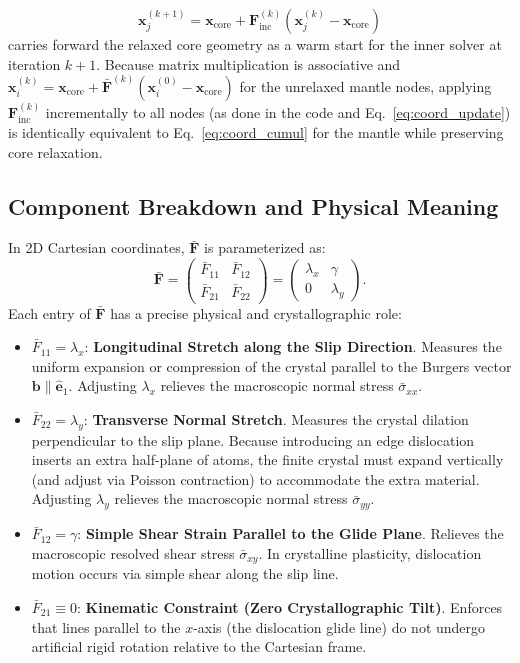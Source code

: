 \documentclass[11pt,a4paper]{article}
\begin{document}
\begin{equation}
\label{eq:coord_inc}
\mathbf{x}_j^{(k+1)} = \mathbf{x}_{\text{core}} + \mathbf{F}_{\text{inc}}^{(k)} \left( \mathbf{x}_j^{(k)} - \mathbf{x}_{\text{core}} \right)
\end{equation}
carries forward the relaxed core geometry as a warm start for the inner solver at iteration $k+1$. Because matrix multiplication is associative and $\mathbf{x}_i^{(k)} = \mathbf{x}_{\text{core}} + \bar{\mathbf{F}}^{(k)} (\mathbf{x}_i^{(0)} - \mathbf{x}_{\text{core}})$ for the unrelaxed mantle nodes, applying $\mathbf{F}_{\text{inc}}^{(k)}$ incrementally to all nodes (as done in the code and Eq.~\eqref{eq:coord_update}) is identically equivalent to Eq.~\eqref{eq:coord_cumul} for the mantle while preserving core relaxation.

\subsection{Component Breakdown and Physical Meaning}

In 2D Cartesian coordinates, $\bar{\mathbf{F}}$ is parameterized as:
\begin{equation}
\label{eq:F_bar_matrix}
\bar{\mathbf{F}} = \begin{pmatrix} \bar{F}_{11} & \bar{F}_{12} \\ \bar{F}_{21} & \bar{F}_{22} \end{pmatrix} = \begin{pmatrix} \lambda_x & \gamma \\ 0 & \lambda_y \end{pmatrix}.
\end{equation}
Each entry of $\bar{\mathbf{F}}$ has a precise physical and crystallographic role:
\begin{itemize}
    \item $\bar{F}_{11} = \lambda_x$: 
    \textbf{Longitudinal Stretch along the Slip Direction}. Measures the uniform expansion or compression of the crystal parallel to the Burgers vector $\mathbf{b} \parallel \hat{\mathbf{e}}_1$. Adjusting $\lambda_x$ relieves the macroscopic normal stress $\bar{\sigma}_{xx}$.
    \item $\bar{F}_{22} = \lambda_y$: 
    \textbf{Transverse Normal Stretch}. Measures the crystal dilation perpendicular to the slip plane. Because introducing an edge dislocation inserts an extra half-plane of atoms, the finite crystal must expand vertically (and adjust via Poisson contraction) to accommodate the extra material. Adjusting $\lambda_y$ relieves the macroscopic normal stress $\bar{\sigma}_{yy}$.
    \item $\bar{F}_{12} = \gamma$: 
    \textbf{Simple Shear Strain Parallel to the Glide Plane}. Relieves the macroscopic resolved shear stress $\bar{\sigma}_{xy}$. In crystalline plasticity, dislocation motion occurs via simple shear along the slip line.
    \item $\bar{F}_{21} \equiv 0$: 
    \textbf{Kinematic Constraint (Zero Crystallographic Tilt)}. Enforces that lines parallel to the $x$-axis (the dislocation glide line) do not undergo artificial rigid rotation relative to the Cartesian frame.
\end{itemize}
\end{document}
